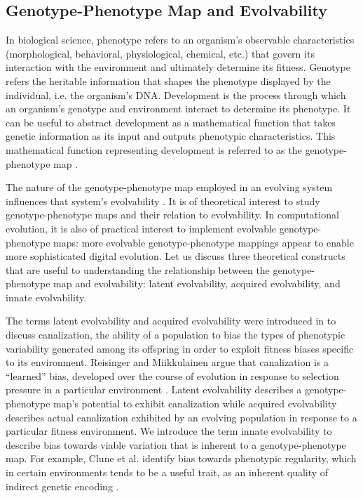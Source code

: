 \subsection{Genotype-Phenotype Map and Evolvability}

In biological science, phenotype refers to an organism's observable characteristics (morphological, behavioral, physiological, chemical, etc.) that govern its interaction with the environment and ultimately determine its fitness.
Genotype refers the heritable information that shapes the phenotype displayed by the individual, i.e. the organism's DNA.
Development is the process through which an organism's genotype and environment interact to determine its phenotype.
It can be useful to abstract development as a mathematical function that takes genetic information as its input and outputs phenotypic characteristics.
This mathematical function representing development is referred to as the genotype-phenotype map \cite{alberch1991genes}.

The nature of the genotype-phenotype map employed in an evolving system influences that system's evolvability \cite{pigliucci2010genotype}.
It is of theoretical interest to study genotype-phenotype maps and their relation to evolvability.
In computational evolution, it is also of practical interest to implement evolvable genotype-phenotype maps: more evolvable genotype-phenotype mappings appear to enable more sophisticated digital evolution.
Let us discuss three theoretical constructs that are useful to understanding the relationship between the genotype-phenotype map and evolvability: latent evolvability, acquired evolvability, and innate evolvability.

The terms latent evolvability and acquired evolvability were introduced in \cite{reisinger2005towards} to discuss canalization, the ability of a population to bias the types of phenotypic variability generated among its offspring in order to exploit fitness biases specific to its environment.
Reisinger and Miikkulainen argue that canalization is a ``learned'' bias, developed over the course of evolution in response to selection pressure in a particular environment \cite{reisinger2005towards}.
Latent evolvability describes a genotype-phenotype map's potential to exhibit canalization while acquired evolvability describes actual canalization exhibited by an evolving population in response to a particular fitness environment.
We introduce the term innate evolvability to describe bias towards viable variation that is inherent to a genotype-phenotype map.
For example, Clune et al. identify bias towards phenotypic regularity, which in certain environments tends to be a useful trait, as an inherent quality of indirect genetic encoding \cite{clune2008generative}.

